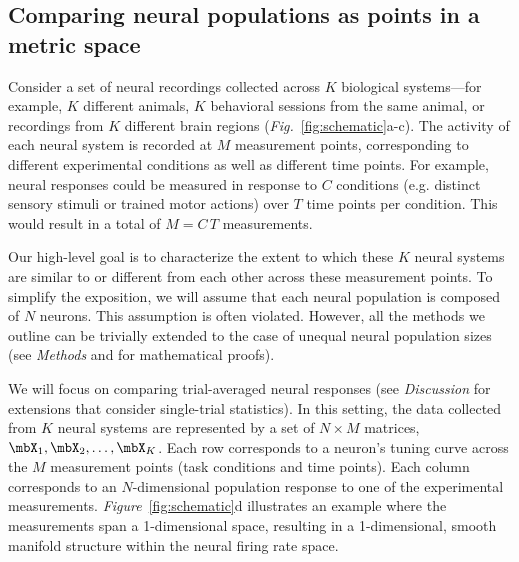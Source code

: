 
\subsection{Comparing neural populations as points in a metric space}


Consider a set of neural recordings collected across $K$ biological systems---for example, $K$ different animals, $K$ behavioral sessions from the same animal, or recordings from $K$ different brain regions (\textit{Fig.}~\ref{fig:schematic}a-c).
The activity of each neural system is recorded at $M$ measurement points, corresponding to different experimental conditions as well as different time points.
For example, neural responses could be measured in response to $C$ conditions (e.g. distinct sensory stimuli or trained motor actions) over $T$ time points per condition.
This would result in a total of $M = C\,T$ measurements.

Our high-level goal is to characterize the extent to which these $K$ neural systems are similar to or different from each other across these measurement points.
To simplify the exposition, we will assume that each neural population is composed of $N$ neurons.
This assumption is often violated.
However, all the methods we outline can be trivially extended to the case of unequal neural population sizes (see \textit{Methods} and \cite{harvey2024duality} for mathematical proofs).


We will focus on comparing trial-averaged neural responses (see \textit{Discussion} for extensions that consider single-trial statistics).
In this setting, the data collected from $K$ neural systems are represented by a set of $N \times M$ matrices, $\mbX_1, \mbX_2, \dots, \mbX_K$.
Each row corresponds to a neuron's tuning curve across the $M$ measurement points (task conditions and time points).
Each column corresponds to an $N$-dimensional population response to one of the experimental measurements.
\textit{Figure}~\ref{fig:schematic}d illustrates an example where the measurements span a 1-dimensional space, resulting in a 1-dimensional, smooth manifold structure within the neural firing rate space.


